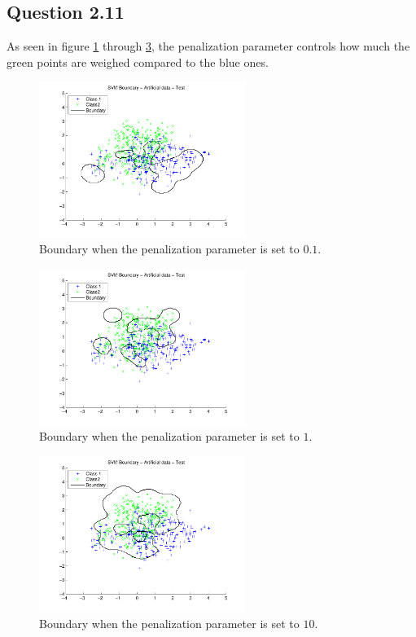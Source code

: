 \subsection*{Question 2.11}

As seen in figure \ref{fig:q211.1} through \ref{fig:q211.3}, the
penalization parameter controls how much the green points are weighed
compared to the blue ones.

\begin{figure}[!htbp]
  \centering
  \includegraphics[width=0.6\textwidth]{./images/q211_0_1.pdf}
  \caption{Boundary when the penalization parameter is set to $0.1$.}
  \label{fig:q211.1}
\end{figure}
\begin{figure}[!htbp]
  \centering
  \includegraphics[width=0.6\textwidth]{./images/q211_01.pdf}
  \caption{Boundary when the penalization parameter is set to $1$.}
  \label{fig:q211.2}
\end{figure}
\begin{figure}[!htbp]
  \centering
  \includegraphics[width=0.6\textwidth]{./images/q211_10.pdf}
  \caption{Boundary when the penalization parameter is set to $10$.}
  \label{fig:q211.3}
\end{figure}

